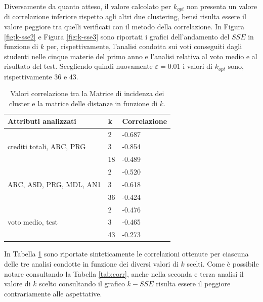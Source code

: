 \documentclass[12pt]{article}
\begin{document}
Diversamente da quanto atteso, il valore calcolato per $k_{opt}$ non presenta un valore di correlazione 
inferiore rispetto agli altri due clustering, 
bensì risulta essere il valore peggiore tra quelli verificati con il metodo della correlazione. 
In Figura \ref{fig:k-sse2} e Figura \ref{fig:k-sse3} sono riportati i grafici dell'andamen\-to 
del $SSE$ in funzione di $k$ per, rispettivamente, 
l'analisi condotta sui voti conseguiti dagli studenti nelle cinque materie del primo anno e l'analisi relativa al voto medio e al risultato del test. 
Scegliendo quindi nuovamen\-te $\varepsilon=0.01$ i valori di $k_{opt}$ sono, rispettivamente $36$ e $43$. 

\begin{table}[H]
\centering
\begin{tabular}{@{}l|l|l@{}}
\hline
\textbf{Attributi analizzati}   							& \textbf{k} & \textbf{Correlazione} \\ \hline
                                							& 2          & -0.687                \\ \cline{2-3} 
crediti totali, ARC, PRG        							& 3          & -0.854                \\ \cline{2-3} 
                                							& 18         & -0.489                \\ \hline
                                							& 2          & -0.520                \\ \cline{2-3} 
ARC, ASD, PRG, MDL,	AN1	\hspace{3em}									& 3          & -0.618                \\ \cline{2-3} 
                                							& 36         & -0.424                \\ \hline
                                							& 2          & -0.476                \\ \cline{2-3} 
voto medio, test                							& 3          & -0.465                \\ \cline{2-3} 
                                							& 43         & -0.273                \\ \hline
\end{tabular}
\caption{Valori correlazione tra la Matrice di incidenza dei cluster e la matrice delle distanze in funzione di $k$.}
\label{tab:corr2}
\end{table}

In Tabella \ref{tab:corr2} sono riportate sinteticamente le correlazioni ottenute per ciascuna delle tre analisi condotte in funzione dei diversi valori di $k$ scelti. Come è possibile notare consultando la Tabella \ref{tab:corr}, anche nella seconda e terza analisi il valore di $k$ scelto consultando il grafico $k-SSE$ risulta essere il peggiore contrariamente alle aspettative.
\end{document}
